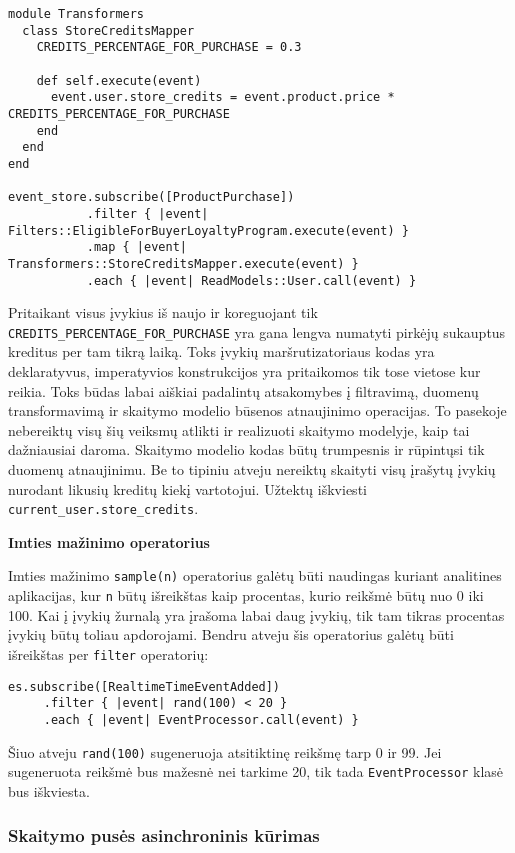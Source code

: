 \begin{lstlisting}[]
module Transformers
  class StoreCreditsMapper
    CREDITS_PERCENTAGE_FOR_PURCHASE = 0.3

    def self.execute(event)
      event.user.store_credits = event.product.price * CREDITS_PERCENTAGE_FOR_PURCHASE
    end
  end
end

event_store.subscribe([ProductPurchase])
           .filter { |event| Filters::EligibleForBuyerLoyaltyProgram.execute(event) }
           .map { |event| Transformers::StoreCreditsMapper.execute(event) }
           .each { |event| ReadModels::User.call(event) }
\end{lstlisting}

Pritaikant visus įvykius iš naujo ir koreguojant tik \lstinline|CREDITS_PERCENTAGE_FOR_PURCHASE| yra gana lengva numatyti pirkėjų sukauptus kreditus per tam tikrą laiką. Toks įvykių maršrutizatoriaus kodas yra deklaratyvus, imperatyvios konstrukcijos yra pritaikomos tik tose vietose kur reikia. Toks būdas labai aiškiai padalintų atsakomybes į filtravimą, duomenų transformavimą ir skaitymo modelio būsenos atnaujinimo operacijas. To pasekoje nebereiktų visų šių veiksmų atlikti ir realizuoti skaitymo modelyje, kaip tai dažniausiai daroma. Skaitymo modelio kodas būtų trumpesnis ir rūpintųsi tik duomenų atnaujinimu. Be to tipiniu atveju nereiktų skaityti visų įrašytų įvykių nurodant likusių kreditų kiekį vartotojui. Užtektų iškviesti \lstinline|current_user.store_credits|.

\textbf{Imties mažinimo operatorius}

Imties mažinimo \lstinline|sample(n)| operatorius galėtų būti naudingas kuriant analitines aplikacijas, kur \lstinline|n| būtų išreikštas kaip procentas, kurio reikšmė būtų nuo 0 iki 100. Kai į įvykių žurnalą yra įrašoma labai daug įvykių, tik tam tikras procentas įvykių būtų toliau apdorojami. Bendru atveju šis operatorius galėtų būti išreikštas per \lstinline|filter| operatorių:

\begin{lstlisting}[]
  es.subscribe([RealtimeTimeEventAdded])
     .filter { |event| rand(100) < 20 }
     .each { |event| EventProcessor.call(event) }
\end{lstlisting}

Šiuo atveju \lstinline|rand(100)| sugeneruoja atsitiktinę reikšmę tarp 0 ir 99. Jei sugeneruota reikšmė bus mažesnė nei tarkime 20, tik tada \lstinline|EventProcessor| klasė bus iškviesta.

\subsubsection{Skaitymo pusės asinchroninis kūrimas}

